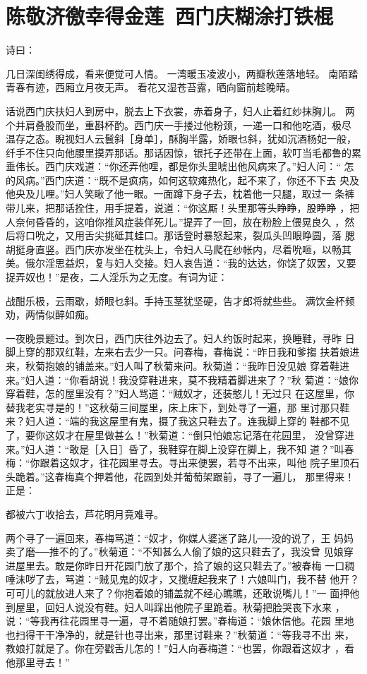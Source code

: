 \chapter{陈敬济徼幸得金莲~西门庆糊涂打铁棍}

诗曰：

几日深闺绣得成，看来便觉可人情。
一湾暖玉凌波小，两瓣秋莲落地轻。
南陌踏青春有迹，西厢立月夜无声。
看花又湿苍苔露，晒向窗前趁晚晴。

话说西门庆扶妇人到房中，脱去上下衣裳，赤着身子，妇人止着红纱抹胸儿。
两个并肩叠股而坐，重斟杯酌。西门庆一手搂过他粉颈，一递一口和他吃酒，极尽
温存之态。睨视妇人云鬟斜［身单］，酥胸半露，娇眼乜斜，犹如沉酒杨妃一般，
纤手不住只向他腰里摸弄那话。那话因惊，银托子还带在上面，软叮当毛都鲁的累
垂伟长。西门庆戏道：“你还弄他哩，都是你头里唬出他风病来了。”妇人问：“
怎的风病。”西门庆道：“既不是疯病，如何这软瘫热化，起不来了，你还不下去
央及他央及儿哩。”妇人笑瞅了他一眼。一面蹲下身子去，枕着他一只腿，取过一
条裤带儿来，把那话拴住，用手提着，说道：“你这厮！头里那等头睁睁，股睁睁
，把人奈何昏昏的，这咱你推风症装佯死儿。”提弄了一回，放在粉脸上偎晃良久
，然后将口吮之，又用舌尖挑砥其蛙口。那话登时暴怒起来，裂瓜头凹眼睁圆，落
腮胡挺身直竖。西门庆亦发坐在枕头上，令妇人马爬在纱帐内，尽着吮咂，以畅其
美。俄尔淫思益炽，复与妇人交接。妇人哀告道：“我的达达，你饶了奴罢，又要
捉弄奴也！”是夜，二人淫乐为之无度。有词为证：

战酣乐极，云雨歇，娇眼乜斜。手持玉茎犹坚硬，告才郎将就些些。
满饮金杯频劝，两情似醉如痴。

一夜晚景题过。到次日，西门庆往外边去了。妇人约饭时起来，换睡鞋，寻昨
日脚上穿的那双红鞋，左来右去少一只。问春梅，春梅说：“昨日我和爹搊
扶着娘进来，秋菊抱娘的铺盖来。”妇人叫了秋菊来问。秋菊道：“我昨日没见娘
穿着鞋进来。”妇人道：“你看胡说！我没穿鞋进来，莫不我精着脚进来了？”秋
菊道：“娘你穿着鞋，怎的屋里没有？”妇人骂道：“贼奴才，还装憨儿！无过只
在这屋里，你替我老实寻是的！”这秋菊三间屋里，床上床下，到处寻了一遍，那
里讨那只鞋来？妇人道：“端的我这屋里有鬼，摄了我这只鞋去了。连我脚上穿的
鞋都不见了，要你这奴才在屋里做甚么！”秋菊道：“倒只怕娘忘记落在花园里，
没曾穿进来。”妇人道：“敢是［入日］昏了，我鞋穿在脚上没穿在脚上，我不知
道？”叫春梅：“你跟着这奴才，往花园里寻去。寻出来便罢，若寻不出来，叫他
院子里顶石头跪着。”这春梅真个押着他，花园到处并葡萄架跟前，寻了一遍儿，
那里得来！正是：

都被六丁收拾去，芦花明月竟难寻。

两个寻了一遍回来，春梅骂道：“奴才，你媒人婆迷了路儿──没的说了，王
妈妈卖了磨──推不的了。”秋菊道：“不知甚么人偷了娘的这只鞋去了，我没曾
见娘穿进屋里去。敢是你昨日开花园门放了那个，拾了娘的这只鞋去了。”被春梅
一口稠唾沫哕了去，骂道：“贼见鬼的奴才，又搅缠起我来了！六娘叫门，我不替
他开？可可儿的就放进人来了？你抱着娘的铺盖就不经心瞧瞧，还敢说嘴儿！”一
面押他到屋里，回妇人说没有鞋。妇人叫踩出他院子里跪着。秋菊把脸哭丧下水来
，说：“等我再往花园里寻一遍，寻不着随娘打罢。”春梅道：“娘休信他。花园
里地也扫得干干净净的，就是针也寻出来，那里讨鞋来？”秋菊道：“等我寻不出
来，教娘打就是了。你在旁戳舌儿怎的！”妇人向春梅道：“也罢，你跟着这奴才
，看他那里寻去！”

